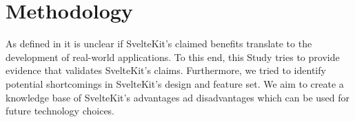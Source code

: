 \section{Methodology}
\label{sec:methodology}







As defined in  it is unclear if SvelteKit's claimed benefits translate to the development of real-world applications. To this end, this Study tries to provide evidence that validates SvelteKit's claims. Furthermore, we tried to identify potential shortcomings in SvelteKit's design and feature set. We aim to create a knowledge base of SvelteKit's advantages ad disadvantages which can be used for future technology  choices.

